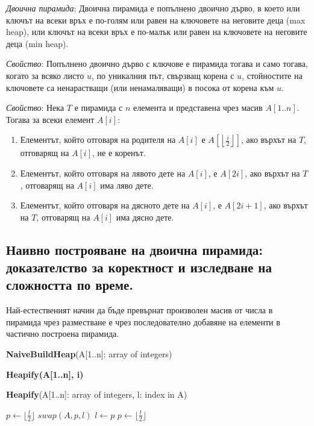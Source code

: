 \documentclass{article}
\renewcommand{\\}{\newline}
\newcommand{\amp}{\;\&\;}
\begin{document}
\textit{Двоична пирамида}: Двоична пирамида е попълнено двоично дърво, в което или ключът на всеки връх е по-голям или равен на ключовете на неговите деца (max heap), или ключът на всеки връх е по-малък или равен на ключовете на неговите деца (min heap).

\textit{Свойство}: Попълнено двоично дърво с ключове е пирамида тогава и само тогава, когато за всяко листо \(u\), по уникалния път, свързващ корена с \(u\), стойностите на ключовете са ненарастващи (или ненамаляващи) в посока от корена към \(u\).

\textit{Свойство}: Нека \(T\) е пирамида с \(n\)  елемента и представена чрез масив \(A[1..n]\). Тогава за всеки елемент \(A[i]\): 
\begin{enumerate}
  \item Елементът, който отговаря на родителя на \(A[i]\) е \(A[\left\lfloor \frac{i}{2}\right\rfloor]\), ако върхът на \(T\), отговарящ на \(A[i]\), не е коренът.
  \item Елементът, който отговаря на лявото дете на \(A[i]\), е \(A[2i]\), ако върхът на \(T\), отговарящ на \(A[i]\) има ляво дете.    
  \item Елементът, който отговаря на дясното дете на \(A[i]\), е \(A[2i+1]\), ако върхът на \(T\), отговарящ на \(A[i]\) има дясно дете.    
\end{enumerate}

\subsection{Наивно построяване на двоична пирамида: доказателство за коректност и изследване на сложността по време. }

Най-естественият начин да бъде превърнат произволен масив от числа в пирамида чрез разместване е чрез последователно добавяне на елементи в частично построена пирамида.

\textbf{NaiveBuildHeap}(A[1..n]: array of integers) 
\begin{algorithmic}[1]
        \textbf{Heapify(A[1..n], i)}
    \EndFor
  \end{algorithmic}

  \textbf{Heapify}(A[1..n]: array of integers, l: index in A) 
\begin{algorithmic}[1]
    \State \(p \gets \lfloor \frac{l}{2}\rfloor\)
    \While{\(p > 0 \;\amp\; A[p] > A[l]\)}
        \State \(swap(A, p, l)\)
        \State \(l \gets p\)
        \State \(p \gets \lfloor \frac{l}{2}\rfloor\)
    \EndWhile
\end{algorithmic} 
\end{document}
